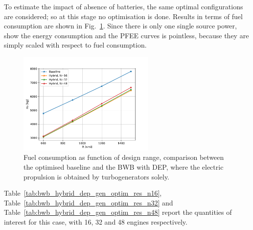 To estimate the impact of absence of batteries, the same optimal configurations are considered; so at this stage no optimisation is done. 
Results in terms of fuel consumption are shown in Fig.~\ref{fig:bwb_hybrid_dep_gen_optim_mf_comp}.
Since there is only one single source power, show the energy consumption and the PFEE curves is pointless, because they are simply scaled with respect to fuel consumption.
\begin{figure}[!h]
	\centering
	\includegraphics[keepaspectratio, width=0.6\textwidth]{images/chap4/bwb_hybrid_gen_optim_mf_comp}
	\caption{Fuel consumption as function of design range, comparison between the optimised baseline and the BWB with DEP, where the electric propulsion is obtained by turbogenerators solely.}
	\label{fig:bwb_hybrid_dep_gen_optim_mf_comp}
\end{figure}
Table~\ref{tab:bwb_hybrid_dep_gen_optim_res_n16}, Table~\ref{tab:bwb_hybrid_dep_gen_optim_res_n32} and Table~\ref{tab:bwb_hybrid_dep_gen_optim_res_n48} report the quantities of interest for this case, with 16, 32 and 48 engines respectively. 
